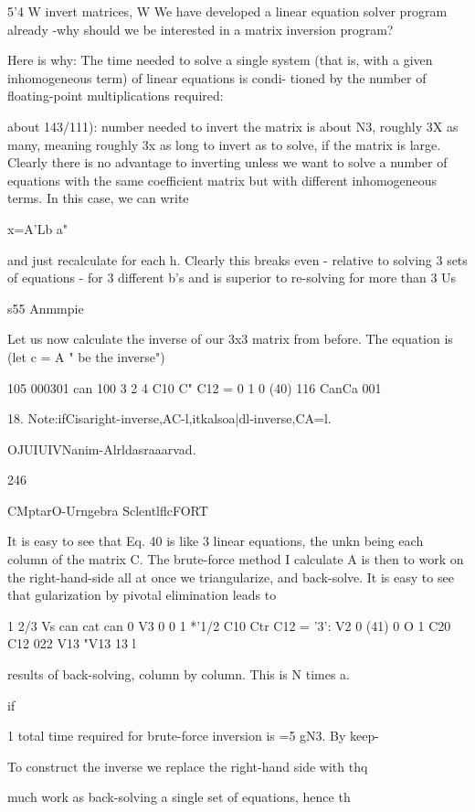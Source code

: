 {{{{{{{{5'4 W invert matrices, W
We have developed a linear equation solver program already
-why should we be interested in a matrix inversion program?

Here is why: The time needed to solve a single system (that is,
with a given inhomogeneous term) of linear equations is condi-
tioned by the number of floating-point multiplications required:

about 143/111): number needed to invert the matrix is about N3,
roughly 3X as many, meaning roughly 3x as long to invert as to
solve, if the matrix is large. Clearly there is no advantage to
inverting unless we want to solve a number of equations with the
same coefficient matrix but with different inhomogeneous terms.
In this case, we can write

x=A'Lb a"

and just recalculate for each h. Clearly this breaks even - relative
to solving 3 sets of equations - for 3 different b's and is superior
to re-solving for more than 3 Us

s55 Anmmpie

Let us now calculate the inverse of our 3x3 matrix from before.
The equation is (let c = A " be the inverse")

105 000301 can 100
3 2 4 C10 C" C12 = 0 1 0 (40)
116 CanCa 001

 

18. Note:ifCisaright-inverse,AC-l,itkalsoa|dl-inverse,CA=l.

OJUIUIVNanim-Alrldasraaarvad.

246

CMptarO-Urngebra SclentlflcFORT

It is easy to see that Eq. 40 is like 3 linear equations, the unkn
being each column of the matrix C. The brute-force method I
calculate A is then to work on the right-hand-side all at once
we triangularize, and back-solve. It is easy to see that
gularization by pivotal elimination leads to

1 2/3 Vs can cat can 0 V3 0
0 1 *'1/2 C10 Ctr C12 = '3': V2 0 (41)
0 O 1 C20 C12 022 V13 "V13  13 l

results of back-solving, column by column. This is N times a.

if

1
total time required for brute-force inversion is =5 gN3. By keep-

To construct the inverse we replace the right-hand side with thq

much work as back-solving a single set of equations, hence th

}}}}}}}}
